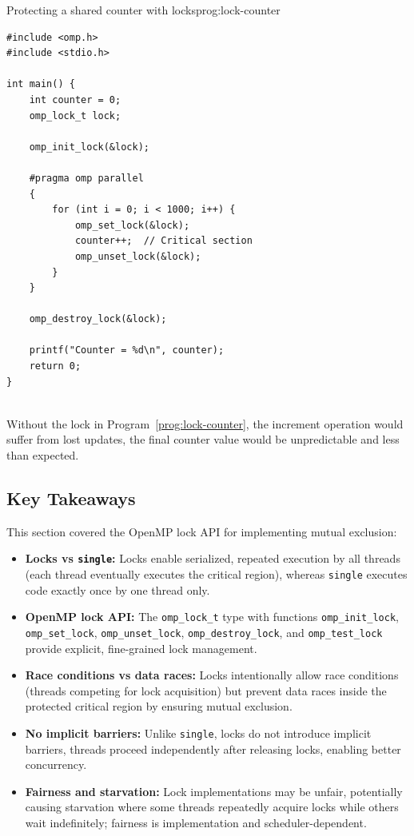 \begin{ppprogram}{Protecting a shared counter with locks}{prog:lock-counter}
\begin{lstlisting}[language=OpenMP]
#include <omp.h>
#include <stdio.h>

int main() {
    int counter = 0;
    omp_lock_t lock;
    
    omp_init_lock(&lock);
    
    #pragma omp parallel
    {
        for (int i = 0; i < 1000; i++) {
            omp_set_lock(&lock);
            counter++;  // Critical section
            omp_unset_lock(&lock);
        }
    }
    
    omp_destroy_lock(&lock);
    
    printf("Counter = %d\n", counter);
    return 0;
}
\end{lstlisting}
\end{ppprogram}

\begin{ppnote}
\\ Without the lock in Program~\ref{prog:lock-counter}, the increment operation would suffer from lost updates, the final counter value would be unpredictable and less than expected.
\end{ppnote}

\subsection{Key Takeaways}

This section covered the OpenMP lock API for implementing mutual exclusion:
\begin{itemize}
    \item \textbf{Locks vs \texttt{single}:} Locks enable serialized, repeated execution by all threads (each thread eventually executes the critical region), whereas \texttt{single} executes code exactly once by one thread only.
    \item \textbf{OpenMP lock API:} The \texttt{omp\_lock\_t} type with functions \texttt{omp\_init\_lock}, \texttt{omp\_set\_lock}, \texttt{omp\_unset\_lock}, \texttt{omp\_destroy\_lock}, and \texttt{omp\_test\_lock} provide explicit, fine-grained lock management.
    \item \textbf{Race conditions vs data races:} Locks intentionally allow race conditions (threads competing for lock acquisition) but prevent data races inside the protected critical region by ensuring mutual exclusion.
    \item \textbf{No implicit barriers:} Unlike \texttt{single}, locks do not introduce implicit barriers, threads proceed independently after releasing locks, enabling better concurrency.
    \item \textbf{Fairness and starvation:} Lock implementations may be unfair, potentially causing starvation where some threads repeatedly acquire locks while others wait indefinitely; fairness is implementation and scheduler-dependent.
\end{itemize}

